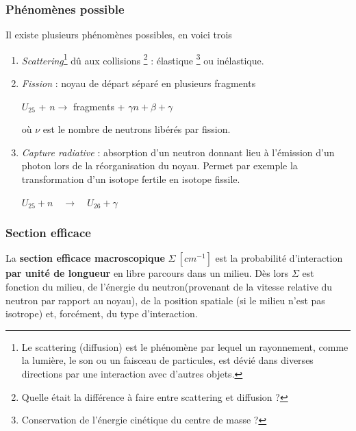 \subsubsection{Phénomènes possible}
Il existe plusieurs phénomènes possibles, en voici trois
\begin{enumerate}
\item \textit{Scattering}\footnote{Le scattering (diffusion) est le phénomène par lequel un rayonnement, comme la lumière, le son ou un faisceau de particules, est dévié dans diverses directions par une interaction avec d'autres objets.} dû aux collisions
\footnote{Quelle était la différence à faire entre scattering et diffusion ?} : élastique 
\footnote{Conservation de l'énergie cinétique du centre de masse ?} ou inélastique.
\item \textit{Fission} : noyau de départ séparé en plusieurs fragments
\begin{center}
$U_{25}$ + $n$\quad$\to$ fragments + $\gamma n + \beta + \gamma$
\end{center}
où $\nu$ est le nombre de neutrons libérés par fission.
\item \textit{Capture radiative} : absorption d'un neutron donnant lieu à l'émission
d'un photon lors de la réorganisation du noyau. Permet par exemple la transformation d'un isotope fertile 
en isotope fissile.
\begin{center}
$U_{25} + n\quad\to\quad U_{26}+\gamma$
\end{center}
\end{enumerate}



\subsubsection{Section efficace}
La \textbf{section efficace macroscopique} $\Sigma\ [cm^{-1}]$ est la probabilité d'interaction \textbf{par unité de 
longueur} en libre parcours dans un milieu.
Dès lors $\Sigma$ est fonction du milieu, de l'énergie du neutron(provenant de la vitesse relative du neutron par rapport
au noyau), de la position spatiale (si le milieu n'est pas isotrope) et, forcément, du type d'interaction.

